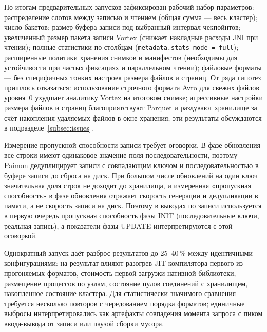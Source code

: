 По итогам предварительных запусков зафиксирован
рабочий набор параметров: распределение слотов между записью и чтением (общая сумма
--- весь кластер); число бакетов; размер буфера записи под выбранный интервал
чекпойнтов; увеличенный размер пакета записи Vortex (снижает накладные расходы JNI
при чтении); полные статистики по столбцам (\texttt{metadata.stats-mode = full});
расширенные политики хранения снимков и манифестов (необходимы для устойчивости при
частых фиксациях и параллельном чтении); файловые форматы --- без специфичных тонких
настроек размера файлов и страниц. От ряда гипотез пришлось отказаться: использование
строчного формата Avro для свежих файлов уровня~0 ухудшает аналитику Vortex на
итоговом снимке; агрессивные настройки размера файлов и страниц благоприятствуют
Parquet и раздувают хранилище за счёт накопления удаляемых файлов в окне хранения;
эти результаты обсуждаются в подразделе~\ref{subsec:issues}.

Измерение пропускной способности записи требует оговорки. В фазе обновления все
строки имеют одинаковое значение поля последовательности, поэтому Paimon
дедуплицирует записи с совпадающим ключом и последовательностью в буфере записи до
сброса на диск. При большом числе обновлений на один ключ значительная доля строк не
доходит до хранилища, и измеренная «пропускная способность» в фазе обновления
отражает скорость генерации и дедупликации в памяти, а не скорость записи на диск.
Поэтому в выводах по записи используется в первую очередь пропускная способность фазы
INIT (последовательные ключи, реальная запись), а показатели фазы UPDATE
интерпретируются с этой оговоркой.

Однократный запуск даёт разброс результатов до 25--40\,\% между
идентичными конфигурациями: на результат влияют разогрев JIT-компилятора первого из
прогоняемых форматов, стоимость первой загрузки нативной библиотеки, размещение
процессов по узлам, состояние пулов соединений с хранилищем, накопленное состояние
кластера. Для статистически значимого сравнения требуется несколько повторов с
чередованием порядка форматов; единичные выбросы
интерпретировались как артефакты совпадения момента запроса с пиком ввода-вывода от
записи или паузой сборки мусора.
